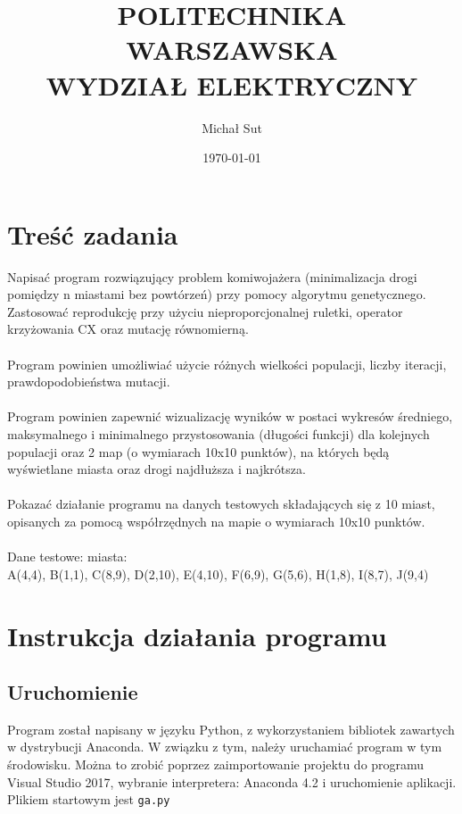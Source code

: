 \documentclass[a4paper,11pt]{article}
\title{POLITECHNIKA WARSZAWSKA \\ WYDZIAŁ ELEKTRYCZNY \\}
\author{Michał Sut}
\date{\today}
\begin{document}
	\thispagestyle{empty}
	\maketitle
	\date{}
	\section{Treść zadania}
		Napisać program rozwiązujący problem komiwojażera (minimalizacja drogi pomiędzy n miastami bez powtórzeń) przy pomocy algorytmu genetycznego. Zastosować reprodukcję przy użyciu nieproporcjonalnej ruletki, operator krzyżowania CX oraz mutację równomierną.\\~\\
		Program powinien umożliwiać użycie różnych wielkości populacji, liczby iteracji, prawdopodobieństwa mutacji.
		\\~\\
		Program powinien zapewnić wizualizację wyników w postaci wykresów średniego, maksymalnego i minimalnego przystosowania (długości funkcji) dla kolejnych populacji oraz 2 map (o wymiarach 10x10 punktów), na których będą wyświetlane miasta oraz drogi najdłuższa i najkrótsza.
		\\~\\
		Pokazać działanie programu na danych testowych składających się z 10 miast, opisanych za pomocą współrzędnych na mapie o wymiarach 10x10 punktów.
		\\~\\
		Dane testowe: miasta:\\
		A(4,4), B(1,1), C(8,9), D(2,10), E(4,10), F(6,9), G(5,6), H(1,8), I(8,7), J(9,4)
	\section{Instrukcja działania programu}
		\subsection{Uruchomienie}
			Program został napisany w języku Python, z wykorzystaniem bibliotek zawartych w dystrybucji Anaconda. W związku z tym, należy uruchamiać program w tym środowisku. Można to zrobić poprzez zaimportowanie projektu do programu Visual Studio 2017, wybranie interpretera: Anaconda 4.2 i uruchomienie aplikacji. Plikiem startowym jest \texttt{ga.py}
\end{document}
